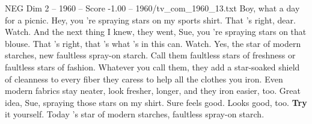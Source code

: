 \begin{textsample}{NEG Dim 2 – 1960 – Score -1.00 – 1960/tv\_com\_1960\_13.txt}  \label{ex:f2_neg_080}
Boy, what a day for a picnic.
Hey, you 're spraying stars on my sports shirt.
That 's right, dear.
Watch.
And the next thing I knew, they went, Sue, you 're spraying stars on that blouse.
That 's right, that 's what 's in this can.
Watch.
Yes, the star of modern starches, new faultless spray-on starch.
Call them faultless stars of freshness or faultless stars of fashion.
Whatever you call them, they add a star-soaked shield of cleanness to every fiber they caress to help all the clothes you iron.
Even modern fabrics stay neater, look fresher, longer, and they iron easier, too.
Great idea, Sue, spraying those stars on my shirt.
Sure feels good.
Looks good, too. \textbf{Try} it yourself.
Today 's star of modern starches, faultless spray-on starch.

\end{textsample}
